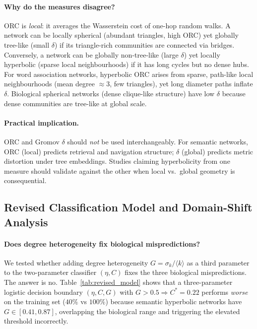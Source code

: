 \documentclass[11pt,a4paper]{article}
\begin{document}
\paragraph{Why do the measures disagree?}
ORC is \emph{local}: it averages the Wasserstein cost of one-hop random walks. A network can be locally spherical (abundant triangles, high ORC) yet globally tree-like (small $\delta$) if its triangle-rich communities are connected via bridges. Conversely, a network can be globally non-tree-like (large $\delta$) yet locally hyperbolic (sparse local neighbourhoods) if it has long cycles but no dense hubs. For word association networks, hyperbolic ORC arises from sparse, path-like local neighbourhoods (mean degree $\approx 3$, few triangles), yet long diameter paths inflate $\delta$. Biological spherical networks (dense clique-like structure) have low $\delta$ because dense communities are tree-like at global scale.

\paragraph{Practical implication.}
ORC and Gromov $\delta$ should \emph{not} be used interchangeably. For semantic networks, ORC (local) predicts retrieval and navigation structure; $\delta$ (global) predicts metric distortion under tree embeddings. Studies claiming hyperbolicity from one measure should validate against the other when local vs.\ global geometry is consequential.

\subsection{Revised Classification Model and Domain-Shift Analysis}
\label{sec:revised_model}

\paragraph{Does degree heterogeneity fix biological mispredictions?}
We tested whether adding degree heterogeneity $G = \sigma_k/\langle k\rangle$ as a third parameter to the two-parameter classifier $(\eta{}, C)$ fixes the three biological mispredictions. The answer is no. Table~\ref{tab:revised_model} shows that a three-parameter logistic decision boundary $(\eta{}, C, G)$ with $G>0.5 \Rightarrow C^* = 0.22$ performs \emph{worse} on the training set ($40\%$ vs $100\%$) because semantic hyperbolic networks have $G \in [0.41, 0.87]$, overlapping the biological range and triggering the elevated threshold incorrectly.
\end{document}
